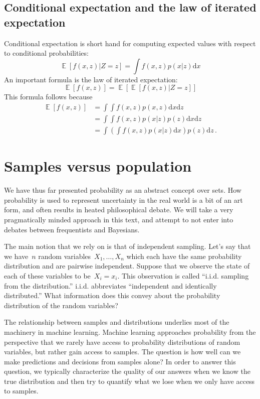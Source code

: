 \documentclass{tufte-book}
\begin{document}
\hypertarget{conditional-expectation-and-the-law-of-iterated-expectation}{%
\subsection{Conditional expectation and the law of iterated
expectation}\label{conditional-expectation-and-the-law-of-iterated-expectation}}

Conditional expectation is short hand for computing expected values with
respect to conditional probabilities: \[
   \mathop\mathbb{E}[f(x,z)|Z=z] = \int f(x,z) p(x|z) \mathrm{d} x
\] An important formula is the law of iterated expectation: \[
  \mathop\mathbb{E}[f(x,z)] = \mathop\mathbb{E}[\mathop\mathbb{E}[f(x,z)|Z=z]]
\] This formula follows because \[
\begin{aligned}
  \mathop\mathbb{E}[f(x,z)] &= \int\int f(x,z) p(x,z) \mathrm{d} x \mathrm{d} z \\
  &= \int\int f(x,z) p(x|z) p(z) \mathrm{d} x \mathrm{d} z \\
  &= \int \left(\int f(x,z) p(x|z)\mathrm{d} x\right) p(z) \mathrm{d} z \,.
  \end{aligned}
\]

\hypertarget{samples-versus-population}{%
\section{Samples versus population}\label{samples-versus-population}}

We have thus far presented probability as an abstract concept over sets.
How probability is used to represent uncertainty in the real world is a
bit of an art form, and often results in heated philosophical debate. We
will take a very pragmatically minded approach in this text, and attempt
to not enter into debates between frequentists and Bayesians.

The main notion that we rely on is that of independent sampling. Let's
say that we have~\(n\) random variables~\(X_1, \ldots, X_n\) which each
have the same probability distribution and are pairwise independent.
Suppose that we observe the state of each of these variables to
be~\(X_i=x_i\). This observation is called ``i.i.d. sampling from the
distribution.'' i.i.d. abbreviates ``independent and identically
distributed.'' What information does this convey about the probability
distribution of the random variables?

The relationship between samples and distributions underlies most of the
machinery in machine learning. Machine learning approaches probability
from the perspective that we rarely have access to probability
distributions of random variables, but rather gain access to samples.
The question is how well can we make predictions and decisions from
samples alone? In order to answer this question, we typically
characterize the quality of our answers when we know the true
distribution and then try to quantify what we lose when we only have
access to samples.
\end{document}
